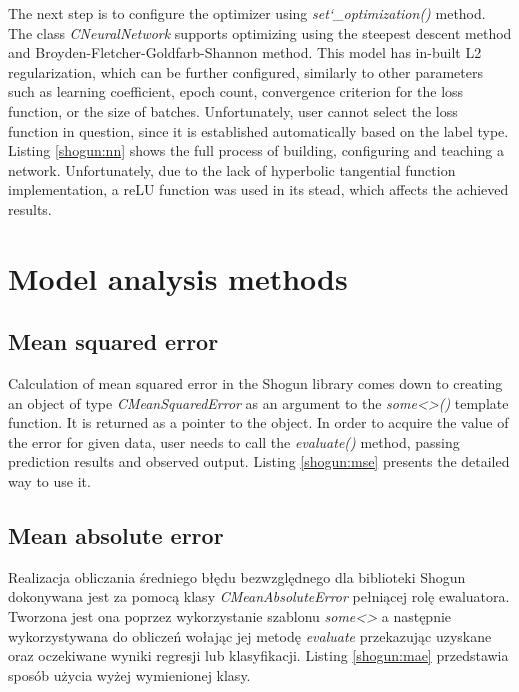 The next step is to configure the optimizer using \textit{set\char`_optimization()} method. The class \textit{CNeuralNetwork} supports optimizing using the steepest descent method and Broyden-Fletcher-Goldfarb-Shannon method. This model has in-built L2 regularization, which can be further configured, similarly to other parameters such as learning coefficient, epoch count, convergence criterion for the loss function, or the size of batches. Unfortunately, user cannot select the loss function in question, since it is established automatically based on the label type. Listing \ref{shogun:nn} shows the full process of building, configuring and teaching a network. Unfortunately, due to the lack of hyperbolic tangential function implementation, a reLU function was used in its stead, which affects the achieved results.


\section{Model analysis methods}

\subsection{Mean squared error}

Calculation of mean squared error in the Shogun library comes down to creating an object of type \textit{CMeanSquaredError} as an argument to the \textit{some<>()} template function. It is returned as a pointer to the object. In order to acquire the value of the error for given data, user needs to call the \textit{evaluate()} method, passing prediction results and observed output. Listing \ref{shogun:mse} presents the detailed way to use it.



\subsection{Mean absolute error}

Realizacja obliczania średniego błędu bezwzględnego dla biblioteki Shogun dokonywana jest za pomocą klasy \textit{CMeanAbsoluteError} pełniącej rolę ewaluatora. Tworzona jest ona poprzez wykorzystanie szablonu \textit{some<>} a następnie wykorzystywana do obliczeń wołając jej metodę \textit{evaluate} przekazując uzyskane oraz oczekiwane wyniki regresji lub klasyfikacji. Listing \ref{shogun:mae} przedstawia sposób użycia wyżej wymienionej klasy.

